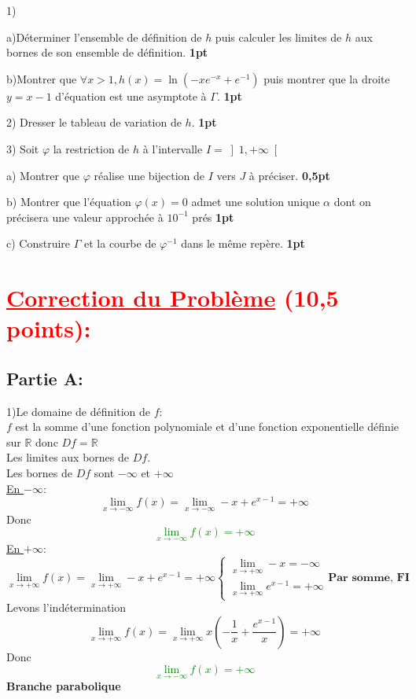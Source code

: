 \documentclass[12pt]{article}
\begin{document}
1)

	a)Déterminer l’ensemble de définition de $h$ puis calculer les limites de $h$ aux bornes de son ensemble de définition. \textbf{1pt}
	
	b)Montrer que $\forall x>1, h(x)=\ln(-xe^{-x}+e^{-1}) $ puis montrer que la droite $y=x-1$ d’équation est une asymptote à $\Gamma$. \textbf{1pt}
	
2) Dresser le tableau de variation de  $h$.   \textbf{1pt}
    
3) Soit $\varphi$ la restriction de $h$ à l’intervalle $I=\left] 1, +\infty \right[ $
    
    a) Montrer que $\varphi$  réalise une bijection de $I$ vers $J$  à préciser.
    \textbf{0,5pt}
        
    b) Montrer que l’équation $\varphi(x)=0$ admet une solution unique $\alpha$ dont on précisera une valeur approchée à $10^{-1}$ prés   \textbf{1pt}
    
    c) Construire $\Gamma$ et la courbe de $\varphi^{-1}$  dans le même repère.  \textbf{1pt}
\section*{\textcolor{red}{\underline{Correction du Problème} (10,5 points):}}
\subsection*{Partie A:}
1)Le domaine de définition de $f$:\\
$f$ est la somme d'une fonction polynomiale et d'une fonction exponentielle définie sur $\mathbb{R}$ donc $Df=\mathbb{R}$\\
Les limites aux bornes de $Df$.\\
Les bornes de $Df$ sont $-\infty$ et $+\infty$\\
\underline{En $-\infty$}:
\[\lim_{x \to -\infty}f(x)=\lim_{x \to -\infty}-x+e^{x-1}=+\infty\]
Donc \textcolor{green}{\[\lim_{x \to -\infty}f(x)=+\infty\]}
\underline{En $+\infty$}:
\begin{equation*}
\lim_{x \to +\infty}f(x)=\lim_{x \to +\infty}-x+e^{x-1}=+\infty
\begin{cases}
\lim_{x \to +\infty} -x=-\infty\\
\lim_{x \to +\infty}e^{x-1}=+\infty
\end{cases}
\textbf{Par somme, FI}
\end{equation*}
Levons l'indétermination\\
\begin{equation*}
\lim_{x \to +\infty}f(x)=\lim_{x \to +\infty}x\left(-\frac{1}{x}+\frac{e^{x-1}}{x}\right)=+\infty
\end{equation*}
Donc \textcolor{green}{\[\lim_{x \to -\infty}f(x)=+\infty\]}
\textbf{Branche parabolique}
 
\end{document}

